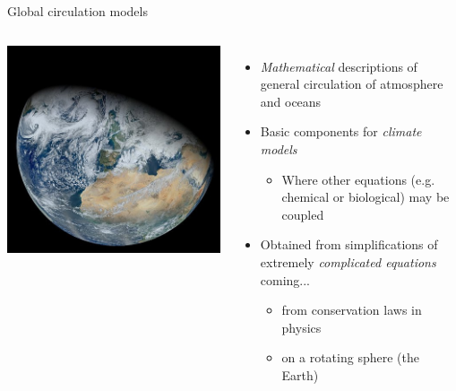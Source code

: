 \begin{frame}{Global circulation models}
  \begin{columns}
     {
      \includegraphics[width=\linewidth]{img/NASA-VIIRS_3Feb2012}
    }
     {
      \begin{itemize}
      \item<1-> \textit{Mathematical} descriptions of general circulation of
        atmosphere and oceans
      \item<2-> Basic components for \textit{climate models}
        \begin{itemize}
        \item Where other equations (e.g. chemical or
          biological) may be coupled
        \end{itemize}
       \item<3-> Obtained from simplifications of extremely \textit{complicated
         equations} coming...
         \begin{itemize}
         \item from %
           conservation laws in physics
         \item on a rotating sphere (the Earth)
         \end{itemize}
      \end{itemize}
      }
  \end{columns}
\end{frame}

